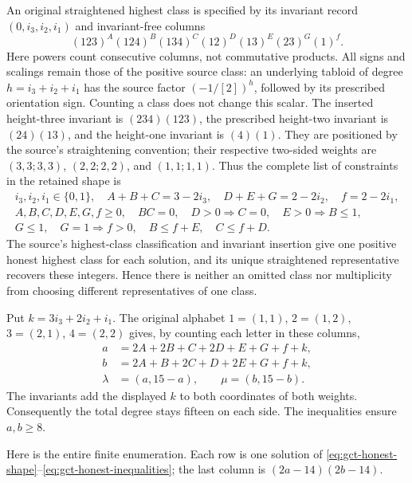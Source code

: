 An original straightened highest class is specified by its invariant
record $(0,i_3,i_2,i_1)$ and invariant-free columns
\[
 (123)^A(124)^B(134)^C(12)^D(13)^E(23)^G(1)^f.
\]
Here powers count consecutive columns, not commutative products.
All signs and scalings remain those of the positive source class:
an underlying tabloid of degree $h=i_3+i_2+i_1$ has the source
factor $(-1/[2])^h$, followed by its prescribed orientation sign.
Counting a class does not change this scalar.
The inserted height-three invariant is $(234)(123)$,
the prescribed height-two invariant is $(24)(13)$, and the
height-one invariant is $(4)(1)$. They are positioned by the
source's straightening convention; their respective two-sided
weights are $(3,3;3,3)$, $(2,2;2,2)$, and $(1,1;1,1)$.
Thus the complete list of constraints in the retained shape is
\begin{gather}
 i_3,i_2,i_1\in\{0,1\},\quad
 A+B+C=3-2i_3,\quad D+E+G=2-2i_2,\quad f=2-2i_1,
 \label{eq:gct-honest-shape}\\
 A,B,C,D,E,G,f\geq0,\quad BC=0,\quad
 D>0\Longrightarrow C=0,\quad E>0\Longrightarrow B\leq1,
 \nonumber\\
 G\leq1,\quad G=1\Longrightarrow f>0,\quad
 B\leq f+E,\quad C\leq f+D.\label{eq:gct-honest-inequalities}
\end{gather}
The source's highest-class classification and invariant insertion
give one positive honest highest class for each solution, and its
unique straightened representative recovers these integers. Hence
there is neither an omitted class nor multiplicity from choosing
different representatives of one class.

Put $k=3i_3+2i_2+i_1$. The original alphabet
$1=(1,1)$, $2=(1,2)$, $3=(2,1)$, $4=(2,2)$ gives, by counting
each letter in these columns,
\begin{align}
 a&=2A+2B+C+2D+E+G+f+k,\nonumber\\
 b&=2A+B+2C+D+2E+G+f+k,\label{eq:gct-highest-letter-weights}\\
 \lambda&=(a,15-a),\qquad \mu=(b,15-b).\nonumber
\end{align}
The invariants add the displayed $k$ to both coordinates of both
weights. Consequently the total degree stays fifteen on each side.
The inequalities ensure $a,b\geq8$.

Here is the entire finite enumeration. Each row is one solution of
\eqref{eq:gct-honest-shape}--\eqref{eq:gct-honest-inequalities};
the last column is $(2a-14)(2b-14)$.


